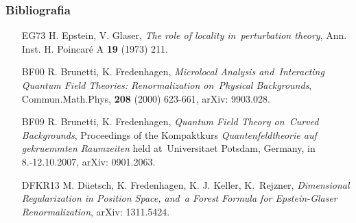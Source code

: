 \documentclass[10pt,t]{beamer}
\begin{document}
\begin{frame}
  \frametitle{Bibliografia}


  \begin{itemize}
    \RaggedRight

  \item [EG73] H. Epstein, V. Glaser, \textit{The role of locality
    in~perturbation theory}, Ann. Inst. H. Poincar\'{e} A
    \textbf{19} (1973) 211.

  \item [BF00] R. Brunetti, K. Fredenhagen, \textit{Microlocal Analysis
    and~Interacting Quantum Field Theories: Renormalization
    on~Physical Backgrounds}, Commun.Math.Phys, \textbf{208} (2000)
    623-661, arXiv: 9903.028.

  \item [BF09] R. Brunetti, K. Fredenhagen, \textit{Quantum Field
    Theory on~Curved Backgrounds}, Proceedings of the
    Kompaktkurs \textit{Quantenfeldtheorie auf gekruemmten Raumzeiten} held
    at~Universitaet Potsdam, Germany, in 8.-12.10.2007, arXiv:
    0901.2063.

  \item [DFKR13] M. D\"{u}etsch, K. Fredenhagen, K. J. Keller,
    K.~Rejzner, \textit{Dimensional Regularization in Position Space,
      and~a Forest Formula for Epstein-Glaser Renormalization}, arXiv:
    1311.5424.

  \end{itemize}

\end{frame}












{}






\end{document}
